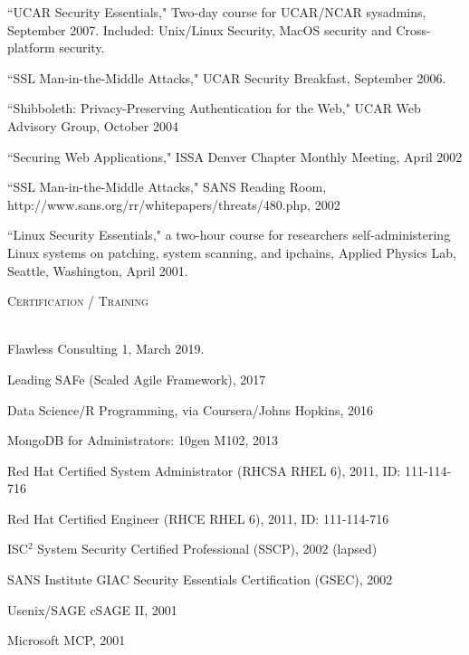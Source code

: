 \documentclass{article}
\newcommand{\lineunder}{\vspace*{-8pt} \\ \hspace*{-18pt} \hrulefill \\}
\newcommand{\header}[1]{{\hspace*{-15pt}\vspace*{6pt} \textsc{#1}} \vspace*{-6pt} \lineunder}
\newenvironment{achievements}{\begin{list}{\topsep 0pt \itemsep -2pt}} {\vspace*{4pt}\end{list}}
\begin{document}
\begin{achievements}
\item ``UCAR Security Essentials,"  Two-day course for UCAR/NCAR sysadmins, September 2007. Included: Unix/Linux Security, MacOS security and Cross-platform security.
\item ``SSL Man-in-the-Middle Attacks," UCAR Security Breakfast, September 2006.
\item ``Shibboleth: Privacy-Preserving Authentication for the Web," UCAR Web Advisory Group, October 2004
\item ``Securing Web Applications," ISSA Denver Chapter Monthly Meeting, April 2002
\item ``SSL Man-in-the-Middle Attacks," SANS Reading Room, http://www.sans.org/rr/whitepapers/threats/480.php, 2002
\item ``Linux Security Essentials," a two-hour course for researchers self-administering Linux systems on patching, system scanning, and ipchains,  Applied Physics Lab, Seattle, Washington, April 2001.
\end{achievements}


\header{Certification / Training}
\begin{achievements}
\item Flawless Consulting 1, March 2019.
\item Leading SAFe (Scaled Agile Framework), 2017
\item Data Science/R Programming, via Coursera/Johns Hopkins, 2016
\item MongoDB for Administrators: 10gen M102, 2013
\item Red Hat Certified System Administrator (RHCSA RHEL 6), 2011, ID: 111-114-716
\item Red Hat Certified Engineer (RHCE RHEL 6), 2011, ID: 111-114-716
\item ISC$^{2}$ System Security Certified Professional (SSCP), 2002 (lapsed)
\item SANS Institute GIAC Security Essentials Certification (GSEC), 2002
\item Usenix/SAGE cSAGE II, 2001
\item Microsoft MCP, 2001
\end{achievements}
\end{document}
